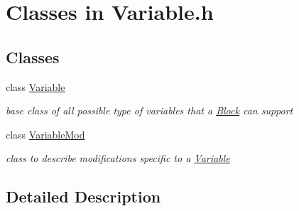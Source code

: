 \hypertarget{group___variable___c_l_a_s_s_e_s}{}\section{Classes in Variable.\+h}
\label{group___variable___c_l_a_s_s_e_s}
\subsection*{Classes}
\begin{DoxyCompactItemize}
\item 
class \mbox{\hyperlink{class_s_m_spp__di__unipi__it_1_1_variable}{Variable}}
\begin{DoxyCompactList}\small\item\em base class of all possible type of variables that a \mbox{\hyperlink{class_s_m_spp__di__unipi__it_1_1_block}{Block}} can support \end{DoxyCompactList}\item 
class \mbox{\hyperlink{class_s_m_spp__di__unipi__it_1_1_variable_mod}{Variable\+Mod}}
\begin{DoxyCompactList}\small\item\em class to describe modifications specific to a \mbox{\hyperlink{class_s_m_spp__di__unipi__it_1_1_variable}{Variable}} \end{DoxyCompactList}\end{DoxyCompactItemize}


\subsection{Detailed Description}
